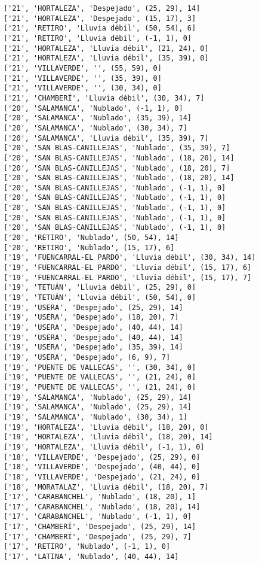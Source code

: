 \documentclass[11pt]{article}
\begin{document}
\begin{Verbatim}[commandchars=\\\{\}]
['21', 'HORTALEZA', 'Despejado', (25, 29), 14]
['21', 'HORTALEZA', 'Despejado', (15, 17), 3]
['21', 'RETIRO', 'Lluvia débil', (50, 54), 6]
['21', 'RETIRO', 'Lluvia débil', (-1, 1), 0]
['21', 'HORTALEZA', 'Lluvia débil', (21, 24), 0]
['21', 'HORTALEZA', 'Lluvia débil', (35, 39), 0]
['21', 'VILLAVERDE', '', (55, 59), 0]
['21', 'VILLAVERDE', '', (35, 39), 0]
['21', 'VILLAVERDE', '', (30, 34), 0]
['21', 'CHAMBERÍ', 'Lluvia débil', (30, 34), 7]
['20', 'SALAMANCA', 'Nublado', (-1, 1), 0]
['20', 'SALAMANCA', 'Nublado', (35, 39), 14]
['20', 'SALAMANCA', 'Nublado', (30, 34), 7]
['20', 'SALAMANCA', 'Lluvia débil', (35, 39), 7]
['20', 'SAN BLAS-CANILLEJAS', 'Nublado', (35, 39), 7]
['20', 'SAN BLAS-CANILLEJAS', 'Nublado', (18, 20), 14]
['20', 'SAN BLAS-CANILLEJAS', 'Nublado', (18, 20), 7]
['20', 'SAN BLAS-CANILLEJAS', 'Nublado', (18, 20), 14]
['20', 'SAN BLAS-CANILLEJAS', 'Nublado', (-1, 1), 0]
['20', 'SAN BLAS-CANILLEJAS', 'Nublado', (-1, 1), 0]
['20', 'SAN BLAS-CANILLEJAS', 'Nublado', (-1, 1), 0]
['20', 'SAN BLAS-CANILLEJAS', 'Nublado', (-1, 1), 0]
['20', 'SAN BLAS-CANILLEJAS', 'Nublado', (-1, 1), 0]
['20', 'RETIRO', 'Nublado', (50, 54), 14]
['20', 'RETIRO', 'Nublado', (15, 17), 6]
['19', 'FUENCARRAL-EL PARDO', 'Lluvia débil', (30, 34), 14]
['19', 'FUENCARRAL-EL PARDO', 'Lluvia débil', (15, 17), 6]
['19', 'FUENCARRAL-EL PARDO', 'Lluvia débil', (15, 17), 7]
['19', 'TETUÁN', 'Lluvia débil', (25, 29), 0]
['19', 'TETUÁN', 'Lluvia débil', (50, 54), 0]
['19', 'USERA', 'Despejado', (25, 29), 14]
['19', 'USERA', 'Despejado', (18, 20), 7]
['19', 'USERA', 'Despejado', (40, 44), 14]
['19', 'USERA', 'Despejado', (40, 44), 14]
['19', 'USERA', 'Despejado', (35, 39), 14]
['19', 'USERA', 'Despejado', (6, 9), 7]
['19', 'PUENTE DE VALLECAS', '', (30, 34), 0]
['19', 'PUENTE DE VALLECAS', '', (21, 24), 0]
['19', 'PUENTE DE VALLECAS', '', (21, 24), 0]
['19', 'SALAMANCA', 'Nublado', (25, 29), 14]
['19', 'SALAMANCA', 'Nublado', (25, 29), 14]
['19', 'SALAMANCA', 'Nublado', (30, 34), 1]
['19', 'HORTALEZA', 'Lluvia débil', (18, 20), 0]
['19', 'HORTALEZA', 'Lluvia débil', (18, 20), 14]
['19', 'HORTALEZA', 'Lluvia débil', (-1, 1), 0]
['18', 'VILLAVERDE', 'Despejado', (25, 29), 0]
['18', 'VILLAVERDE', 'Despejado', (40, 44), 0]
['18', 'VILLAVERDE', 'Despejado', (21, 24), 0]
['18', 'MORATALAZ', 'Lluvia débil', (18, 20), 7]
['17', 'CARABANCHEL', 'Nublado', (18, 20), 1]
['17', 'CARABANCHEL', 'Nublado', (18, 20), 14]
['17', 'CARABANCHEL', 'Nublado', (-1, 1), 0]
['17', 'CHAMBERÍ', 'Despejado', (25, 29), 14]
['17', 'CHAMBERÍ', 'Despejado', (25, 29), 7]
['17', 'RETIRO', 'Nublado', (-1, 1), 0]
['17', 'LATINA', 'Nublado', (40, 44), 14]

\end{Verbatim}
\end{document}
